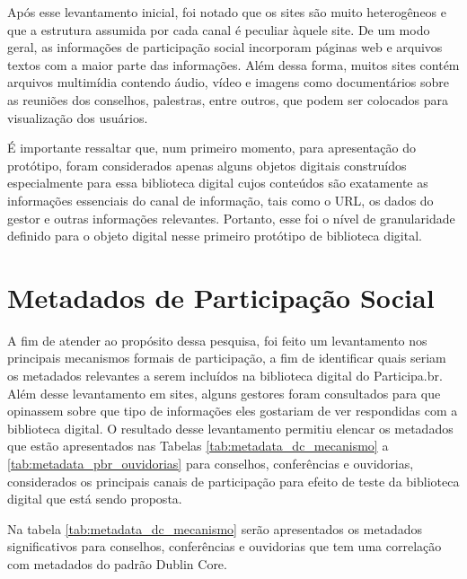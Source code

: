 Após esse levantamento inicial, foi notado que os sites são muito heterogêneos e que a estrutura assumida por cada canal é peculiar àquele site. De um modo geral, as informações de participação social incorporam páginas web e arquivos textos com a maior parte das informações. Além dessa forma, muitos sites contém arquivos multimídia contendo áudio, vídeo e imagens como documentários sobre as reuniões dos conselhos, palestras, entre outros, que podem ser colocados para visualização dos usuários.

É importante ressaltar que, num primeiro momento, para apresentação do protótipo, foram considerados apenas alguns objetos digitais construídos especialmente para essa biblioteca digital cujos conteúdos são exatamente as informações essenciais do canal de informação, tais como o URL, os dados do gestor e outras informações relevantes. Portanto, esse foi o nível de granularidade definido para o objeto digital nesse primeiro protótipo de biblioteca digital.


\section{Metadados de Participação Social}
\label{sub:metadadospbr}

A fim de atender ao propósito dessa pesquisa, foi feito um levantamento nos principais mecanismos formais de participação, a fim de identificar quais seriam os metadados relevantes a serem incluídos na biblioteca digital do Participa.br. Além desse levantamento em sites, alguns gestores foram consultados para que opinassem sobre que tipo de informações eles gostariam de ver respondidas com a biblioteca digital. O resultado desse levantamento permitiu elencar os metadados que estão apresentados nas Tabelas \ref{tab:metadata_dc_mecanismo} a \ref{tab:metadata_pbr_ouvidorias} para conselhos, conferências e ouvidorias, considerados os principais canais de participação para efeito de teste da biblioteca digital que está sendo proposta.

Na tabela \ref{tab:metadata_dc_mecanismo} serão apresentados os metadados significativos para conselhos, conferências e ouvidorias que tem uma correlação com metadados do padrão Dublin Core.

\makeatother 

